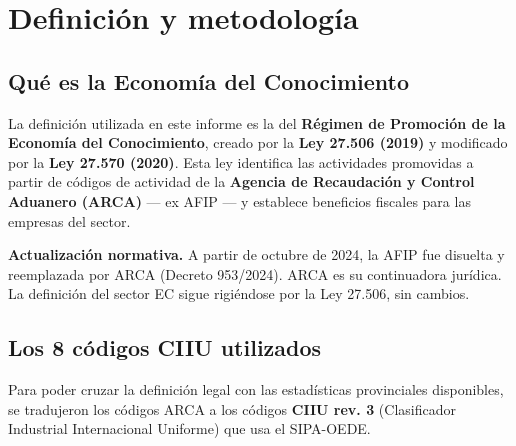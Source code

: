 \documentclass[
  spanish,
  letterpaper,
  DIV=11,
  numbers=noendperiod]{scrartcl}
\begin{document}
\section{Definición y metodología}\label{sec-definicion}

\subsection{Qué es la Economía del
Conocimiento}\label{quuxe9-es-la-economuxeda-del-conocimiento}

La definición utilizada en este informe es la del \textbf{Régimen de
Promoción de la Economía del Conocimiento}, creado por la \textbf{Ley
27.506 (2019)} y modificado por la \textbf{Ley 27.570 (2020)}. Esta ley
identifica las actividades promovidas a partir de códigos de actividad
de la \textbf{Agencia de Recaudación y Control Aduanero (ARCA)} --- ex
AFIP --- y establece beneficios fiscales para las empresas del sector.

\begin{tcolorbox}[enhanced jigsaw, arc=.35mm, bottomrule=.15mm, bottomtitle=1mm, breakable, colback=white, colbacktitle=quarto-callout-note-color!10!white, colframe=quarto-callout-note-color-frame, coltitle=black, left=2mm, leftrule=.75mm, opacityback=0, opacitybacktitle=0.6, rightrule=.15mm, title=\textcolor{quarto-callout-note-color}{\faInfo}\hspace{0.5em}{Nota}, titlerule=0mm, toprule=.15mm, toptitle=1mm]

\textbf{Actualización normativa.} A partir de octubre de 2024, la AFIP
fue disuelta y reemplazada por ARCA (Decreto 953/2024). ARCA es su
continuadora jurídica. La definición del sector EC sigue rigiéndose por
la Ley 27.506, sin cambios.

\end{tcolorbox}

\subsection{Los 8 códigos CIIU
utilizados}\label{los-8-cuxf3digos-ciiu-utilizados}

Para poder cruzar la definición legal con las estadísticas provinciales
disponibles, se tradujeron los códigos ARCA a los códigos \textbf{CIIU
rev. 3} (Clasificador Industrial Internacional Uniforme) que usa el
SIPA-OEDE.
\end{document}
